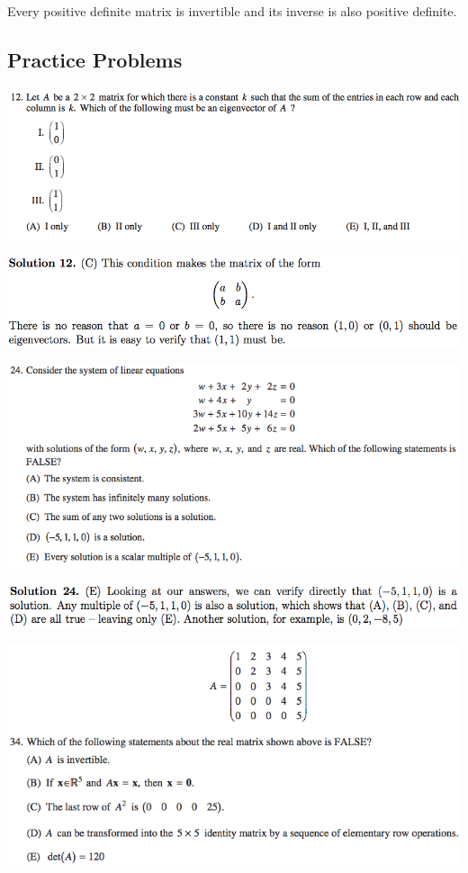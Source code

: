 \documentclass{article}
\begin{document}
Every positive definite matrix is invertible and its inverse is also positive definite.

\subsection{Practice Problems}

\includegraphics[scale=0.5]{0568_12}

\includegraphics[scale=0.5]{0568_12s}

\includegraphics[scale=0.65]{1268_24}

\includegraphics[scale=0.65]{1268_24s}

\includegraphics[scale=0.65]{1268_34}
\end{document}
